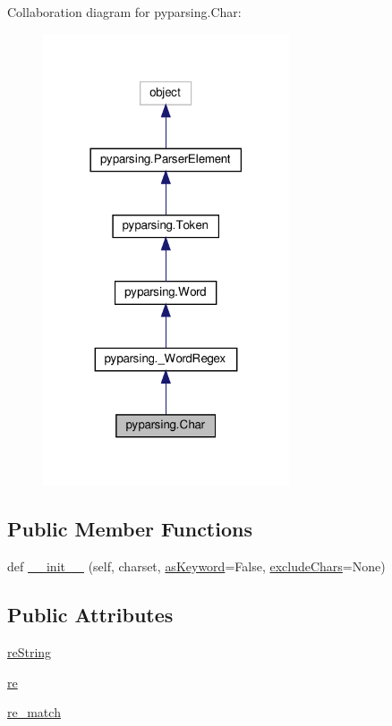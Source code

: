 Collaboration diagram for pyparsing.\+Char\+:
\nopagebreak
\begin{figure}[H]
\begin{center}
\leavevmode
\includegraphics[width=206pt]{classpyparsing_1_1Char__coll__graph}
\end{center}
\end{figure}
\subsection*{Public Member Functions}
\begin{DoxyCompactItemize}
\item 
def \hyperlink{classpyparsing_1_1Char_ac4ee239ff99c41a1648c50854fcb5af5}{\+\_\+\+\_\+init\+\_\+\+\_\+} (self, charset, \hyperlink{classpyparsing_1_1Word_aeb1c56e9084057c44b019c202b018fb1}{as\+Keyword}=False, \hyperlink{namespacepyparsing_a74a0d58c5c3028ec3baa9b4db4a9a9f0}{exclude\+Chars}=None)
\end{DoxyCompactItemize}
\subsection*{Public Attributes}
\begin{DoxyCompactItemize}
\item 
\hyperlink{classpyparsing_1_1Char_a4a3093a76e3eb55abd38e31ab1beee7a}{re\+String}
\item 
\hyperlink{classpyparsing_1_1Char_acb9d929d071f3e317a1c98e7f7a1fa58}{re}
\item 
\hyperlink{classpyparsing_1_1Char_a5e7ad1eaaa654ee9f059ff1c8da82bff}{re\+\_\+match}
\end{DoxyCompactItemize}
